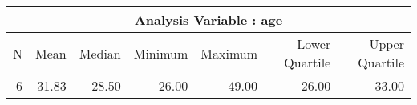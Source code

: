 \documentclass[10pt]{article}
\begin{document}
\begin{longtable}{|r|r|r|r|r|r|r|}\hline
   \multicolumn{7}{|c|}{Analysis Variable : age }\\\hline
   N &    Mean &    Median &    Minimum &    Maximum &    Lower Quartile &    Upper Quartile\\\hline
\endhead
   6 &    31.83 &    28.50 &    26.00 &    49.00 &    26.00 &    33.00\\\hline
\end{longtable}


\pagebreak


\pagebreak

\end{document}
